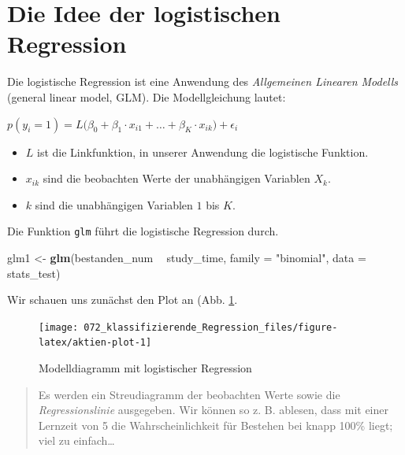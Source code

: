 \documentclass[12pt,ngerman,]{book}
\makeatletter
\newenvironment{Shaded}{\begin{snugshade}}{\end{snugshade}}
\newcommand{\KeywordTok}[1]{\textcolor[rgb]{0.13,0.29,0.53}{\textbf{#1}}}
\newcommand{\DataTypeTok}[1]{\textcolor[rgb]{0.13,0.29,0.53}{#1}}
\newcommand{\StringTok}[1]{\textcolor[rgb]{0.31,0.60,0.02}{#1}}
\newcommand{\OperatorTok}[1]{\textcolor[rgb]{0.81,0.36,0.00}{\textbf{#1}}}
\newcommand{\NormalTok}[1]{#1}
\providecommand{\tightlist}{%
  \setlength{\itemsep}{0pt}\setlength{\parskip}{0pt}}
\newenvironment{kframe}{%
\medskip{}
\setlength{\fboxsep}{.8em}
 \def\at@end@of@kframe{}%
 \ifinner\ifhmode%
  \def\at@end@of@kframe{\end{minipage}}%
  \begin{minipage}{\columnwidth}%
 \fi\fi%
 \def\FrameCommand##1{\hskip\@totalleftmargin \hskip-\fboxsep
 \colorbox{shadecolor}{##1}\hskip-\fboxsep
     \hskip-\linewidth \hskip-\@totalleftmargin \hskip\columnwidth}%
 \MakeFramed {\advance\hsize-\width
   \@totalleftmargin\z@ \linewidth\hsize
   \@setminipage}}%
 {\par\unskip\endMakeFramed%
 \at@end@of@kframe}
\renewenvironment{Shaded}{\begin{kframe}}{\end{kframe}}
\theoremstyle{definition}
\theoremstyle{definition}
\theoremstyle{remark}
\makeatother
\begin{document}
\section{Die Idee der logistischen
Regression}\label{die-idee-der-logistischen-regression}

Die logistische Regression ist eine Anwendung des \emph{Allgemeinen
Linearen Modells} (general linear
model, GLM). Die Modellgleichung lautet:

\(p(y_i=1)=L\bigl(\beta_0+\beta_1\cdot x_{i1}+\dots+\beta_K\cdot x_{ik}\bigr)+\epsilon_i\)

\begin{itemize}
\tightlist
\item
  \(L\) ist die Linkfunktion, in unserer Anwendung die logistische
  Funktion.\\
\item
  \(x_{ik}\) sind die beobachten Werte der unabhängigen Variablen
  \(X_k\).\\
\item
  \(k\) sind die unabhängigen Variablen \(1\) bis \(K\).
\end{itemize}

Die Funktion \texttt{glm} führt die logistische Regression durch.

\begin{Shaded}
\begin{Highlighting}[]
\NormalTok{glm1 <-}\StringTok{ }\KeywordTok{glm}\NormalTok{(bestanden_num }\OperatorTok{~}\StringTok{ }\NormalTok{study_time, }
            \DataTypeTok{family =} \StringTok{"binomial"}\NormalTok{,}
            \DataTypeTok{data =}\NormalTok{ stats_test)}
\end{Highlighting}
\end{Shaded}

Wir schauen uns zunächst den Plot an (Abb. \ref{fig:aktien-plot}.

\begin{figure}

{\centering \texttt{[image: 072\_klassifizierende\_Regression\_files/figure-latex/aktien-plot-1]} 

}

\caption{Modelldiagramm mit logistischer Regression}\label{fig:aktien-plot}
\end{figure}

\begin{quote}
Es werden ein Streudiagramm der beobachten Werte sowie die
\emph{Regressionslinie} ausgegeben. Wir können so z. B. ablesen, dass
mit einer Lernzeit von 5 die Wahrscheinlichkeit für Bestehen bei knapp
100\% liegt; viel zu einfach\ldots{}
\end{quote}
\end{document}
